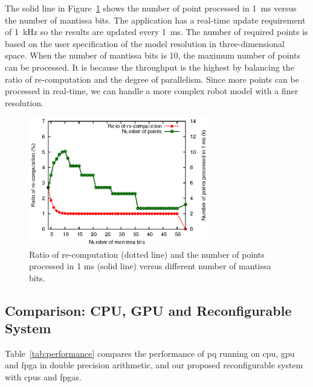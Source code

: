 The solid line in Figure~\ref{fig:recompute} shows the number of point processed in 1~ms versus the number of mantissa bits.
The application has a real-time update requirement of 1~kHz so the results are updated every 1~ms.
The number of required points is based on the user specification of the model resolution in three-dimensional space.
When the number of mantissa bits is 10, the maximum number of points can be processed.
It is because the throughput is the highest by balancing the ratio of re-computation and the degree of parallelism.
Since more points can be processed in real-time, we can handle a more complex robot model with a finer resolution.

\begin{figure}[ht]
\begin{center}
\includegraphics[width=0.7\textwidth]{3_precision/figures/fig_recompute}
\end{center}
\caption[Ratio of re-computation and the number of points processed in 1 ms versus different number of mantissa bits.]{Ratio of re-computation (dotted line) and 
the number of points processed in 1 ms (solid line) versus different number of mantissa bits.}
\label{fig:recompute}
\end{figure}

\subsection{Comparison: CPU, GPU and Reconfigurable System}
Table~\ref{tab:performance} compares the performance of \gls{pq} running on \gls{cpu}, \gls{gpu} and \gls{fpga} in double precision arithmetic, 
and our proposed reconfigurable system with \gls{cpu}s and \gls{fpga}s.


